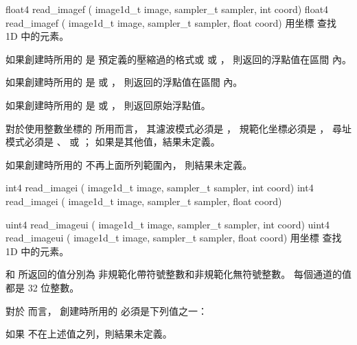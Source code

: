 float4 read_imagef (
	image1d_t image,
	sampler_t sampler,
	int coord)
float4 read_imagef (
	image1d_t image,
	sampler_t sampler,
	float coord)
\stopbuffer
{}
用坐標  查找 1D   中的元素。

如果創建時所用的  是
預定義的壓縮過的格式或  或 ，
則返回的浮點值在區間 \math{[0.0 \cdots 1.0]} 內。

如果創建時所用的  是
  或 ，
則返回的浮點值在區間 \math{[-1.0 \cdots 1.0]} 內。

如果創建時所用的  是
  或 ，
則返回原始浮點值。

對於使用整數坐標的  所用而言，
其濾波模式必須是 ，
規範化坐標必須是 ，
尋址模式必須是 、 
 或 ；
如果是其他值，結果未定義。

如果創建時所用的  不再上面所列範圍內，
則結果未定義。
\stopbuffer

int4 read_imagei (
	image1d_t image,
	sampler_t sampler,
	int coord)
int4 read_imagei (
	image1d_t image,
	sampler_t sampler,
	float coord)

uint4 read_imageui (
	image1d_t image,
	sampler_t sampler,
	int coord)
uint4 read_imageui (
	image1d_t image,
	sampler_t sampler,
	float coord)
\stopbuffer
{}
用坐標  查找 1D   中的元素。

 和  所返回的值分別為
非規範化帶符號整數和非規範化無符號整數。
每個通道的值都是 32 位整數。

對於  而言，
創建時所用的  必須是下列值之一：
\startigBase[indentnext=no]
\item {}
\item {}
\item {}
\stopigBase
如果  不在上述值之列，則結果未定義。

